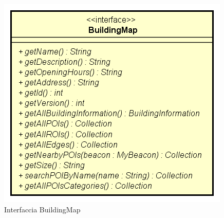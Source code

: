 \documentclass[../DefinizioneDiProdotto.tex]{subfiles}
\begin{document}
    \begin{figure}[H]
        \centering
        \includegraphics{img/BuildingMap.png}
        \caption{Interfaccia BuildingMap}\label{fig:model::navigator::BuildingMap} 
    \end{figure}
\end{document}
